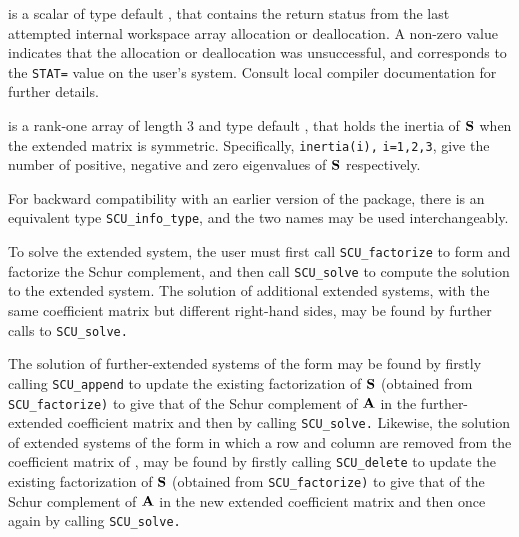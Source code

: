 \documentclass{galahad}
\newcommand{\packagename}{SCU}
\begin{document}
\begin{description}
 is a scalar of type default \integer, that contains
the return status from the last attempted internal
workspace array allocation or deallocation.
A non-zero value indicates that the allocation or deallocation was
 unsuccessful, and corresponds to the {\tt STAT=} value on the user's system.
Consult local compiler documentation for further details.

 is a rank-one array of length 3 and type default \integer,
that holds the inertia of ${\mathbf{S}}$ when the extended matrix is symmetric.
Specifically, {\tt inertia(i),} {\tt i=1,2,3},
give the number of positive, negative and zero eigenvalues of
${\mathbf{S}}$ respectively.

\end{description}

\noindent
For backward compatibility with an earlier version of the package, there
is an equivalent type {\tt \packagename\_info\_type}, and the two names
may be used interchangeably.


\galarguments
To solve the extended system,
the user must first call {\tt \packagename\_factorize} to form and factorize
the Schur complement,
and then call {\tt \packagename\_solve} to compute the solution to the extended
system. The solution of additional extended systems, with the
same coefficient matrix but different right-hand sides, may
be found by further calls to
{\tt \packagename\_solve.}

The solution of further-extended systems of the form
may be found by firstly calling {\tt \packagename\_append} to update the
existing factorization of ${\mathbf{S}}$
(obtained from {\tt \packagename\_factorize)} to give that of
the Schur complement of $ {\mathbf{A}}$
in the further-extended coefficient matrix and then by calling
{\tt \packagename\_solve.}
Likewise, the solution of extended systems of the form
in which a row and column are removed from the
coefficient matrix of ,
may be found by firstly calling {\tt \packagename\_delete} to update the
existing factorization of ${\mathbf{S}}$
(obtained from {\tt \packagename\_factorize)} to give that of
the Schur complement of $ {\mathbf{A}}$
in the new extended coefficient matrix and then once again by calling
{\tt \packagename\_solve.}
\end{document}
